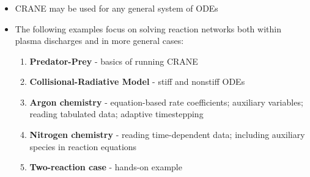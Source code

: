 \begin{frame}[fragile]
	\frametitle{\insertsectionhead}
	\begin{itemize}
		\item CRANE may be used for any general system of ODEs
		\item The following examples focus on solving reaction networks both within plasma discharges and in more general cases:
		\begin{enumerate}
			\item \textbf{Predator-Prey} - basics of running CRANE
			\item \textbf{Collisional-Radiative Model} - stiff and nonstiff ODEs
			\item \textbf{Argon chemistry} - equation-based rate coefficients; auxiliary variables; reading tabulated data; adaptive timestepping
			\item \textbf{Nitrogen chemistry} - reading time-dependent data; including auxiliary species in reaction equations
			\item \textbf{Two-reaction case} - hands-on example
		\end{enumerate}
	\end{itemize}
\end{frame}